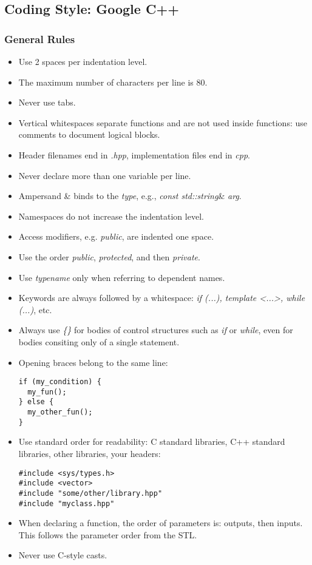 \documentclass[oneside,a4paper,titlepage]{scrartcl} %
\begin{document}
\newpage

\subsection{Coding Style: Google C++}

\subsubsection{General Rules}
\begin{itemize}
 \item Use 2 spaces per indentation level.
 \item The maximum number of characters per line is 80.
 \item Never use tabs.
 \item Vertical whitespaces separate functions and are not used inside functions: use comments to document logical blocks.
 \item Header filenames end in \emph{.hpp}, implementation files end in \emph{cpp}.
 \item Never declare more than one variable per line.
 \item Ampersand {\&} binds to the \emph{type}, e.g., \emph{const std::string}\& \emph{arg}.
 \item Namespaces do not increase the indentation level.
 \item Access modifiers, e.g. \emph{public}, are indented one space.
 \item Use the order \emph{public}, \emph{protected}, and then \emph{private}.
 \item Use \emph{typename} only when referring to dependent names.
 \item Keywords are always followed by a whitespace: \emph{if (...), template \textless...\textgreater, while (...)}, etc.
 \item Always use \emph{\{\}} for bodies of control structures such as \emph{if} or \emph{while}, even for bodies consiting only of a single statement.
 \item Opening braces belong to the same line:
 \begin{lstlisting}
if (my_condition) {
  my_fun();
} else {
  my_other_fun();
}
 \end{lstlisting}
 \item Use standard order for readability: C standard libraries, C++ standard libraries, other libraries, your headers:
 \begin{lstlisting}
#include <sys/types.h>
#include <vector>
#include "some/other/library.hpp"
#include "myclass.hpp"
 \end{lstlisting}
 \item When declaring a function, the order of parameters is: outputs, then inputs. This follows the parameter order from the STL.
 \item Never use C-style casts.
\end{itemize}
\end{document}
